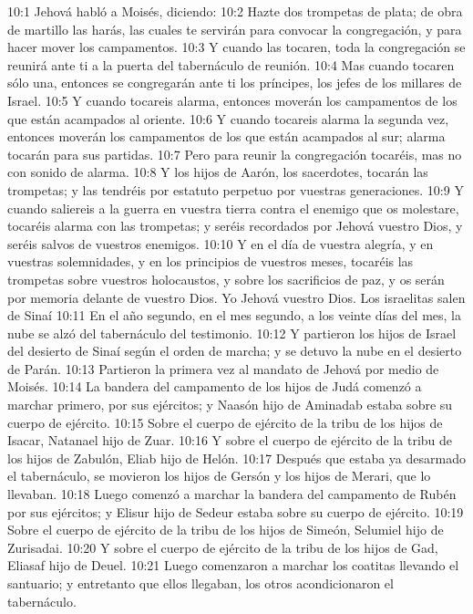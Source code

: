 10:1 Jehová habló a Moisés, diciendo:  
10:2 Hazte dos trompetas de plata; de obra de martillo las harás, las cuales te servirán para convocar la congregación, y para hacer mover los campamentos.  
10:3 Y cuando las tocaren, toda la congregación se reunirá ante ti a la puerta del tabernáculo de reunión.  
10:4 Mas cuando tocaren sólo una, entonces se congregarán ante ti los príncipes, los jefes de los millares de Israel.  
10:5 Y cuando tocareis alarma, entonces moverán los campamentos de los que están acampados al oriente.  
10:6 Y cuando tocareis alarma la segunda vez, entonces moverán los campamentos de los que están acampados al sur; alarma tocarán para sus partidas.  
10:7 Pero para reunir la congregación tocaréis, mas no con sonido de alarma.  
10:8 Y los hijos de Aarón, los sacerdotes, tocarán las trompetas; y las tendréis por estatuto perpetuo por vuestras generaciones.  
10:9 Y cuando saliereis a la guerra en vuestra tierra contra el enemigo que os molestare, tocaréis alarma con las trompetas; y seréis recordados por Jehová vuestro Dios, y seréis salvos de vuestros enemigos.  
10:10 Y en el día de vuestra alegría, y en vuestras solemnidades, y en los principios de vuestros meses, tocaréis las trompetas sobre vuestros holocaustos, y sobre los sacrificios de paz, y os serán por memoria delante de vuestro Dios. Yo Jehová vuestro Dios.  
Los israelitas salen de Sinaí  
10:11 En el año segundo, en el mes segundo, a los veinte días del mes, la nube se alzó del tabernáculo del testimonio.  
10:12 Y partieron los hijos de Israel del desierto de Sinaí según el orden de marcha; y se detuvo la nube en el desierto de Parán.  
10:13 Partieron la primera vez al mandato de Jehová por medio de Moisés.  
10:14 La bandera del campamento de los hijos de Judá comenzó a marchar primero, por sus ejércitos; y Naasón hijo de Aminadab estaba sobre su cuerpo de ejército.  
10:15 Sobre el cuerpo de ejército de la tribu de los hijos de Isacar, Natanael hijo de Zuar.  
10:16 Y sobre el cuerpo de ejército de la tribu de los hijos de Zabulón, Eliab hijo de Helón.  
10:17 Después que estaba ya desarmado el tabernáculo, se movieron los hijos de Gersón y los hijos de Merari, que lo llevaban.  
10:18 Luego comenzó a marchar la bandera del campamento de Rubén por sus ejércitos; y Elisur hijo de Sedeur estaba sobre su cuerpo de ejército.  
10:19 Sobre el cuerpo de ejército de la tribu de los hijos de Simeón, Selumiel hijo de Zurisadai.  
10:20 Y sobre el cuerpo de ejército de la tribu de los hijos de Gad, Eliasaf hijo de Deuel.  
10:21 Luego comenzaron a marchar los coatitas llevando el santuario; y entretanto que ellos llegaban, los otros acondicionaron el tabernáculo.  
